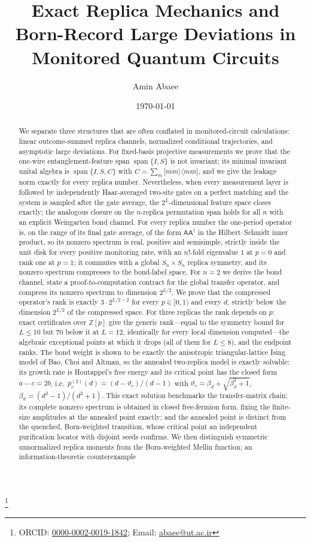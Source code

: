 \documentclass[aps,prx,reprint,superscriptaddress,nobibnotes,longbibliography]{revtex4-2}
\theoremstyle{remark}
\newcommand{\vth}{\vartheta}
\begin{document}
\title{Exact Replica Mechanics and Born-Record Large Deviations in Monitored Quantum Circuits}
\author{Amin Abaee}
\thanks{ORCID: \href{https://orcid.org/0000-0002-0019-1842}{0000-0002-0019-1842}; Email: \href{mailto:abaee@ut.ac.ir}{abaee@ut.ac.ir}}
\date{\today}

\begin{abstract}
We separate three structures that are often conflated in monitored-circuit calculations: linear outcome-summed replica channels, normalized conditional trajectories, and asymptotic large deviations.  For fixed-basis projective measurements we prove that the one-wire entanglement-feature span $\operatorname{span}\{I,S\}$ is not invariant; its minimal invariant unital algebra is $\operatorname{span}\{I,S,C\}$ with $C=\sum_m|mm\rangle\langle mm|$, and we give the leakage norm exactly for every replica number.  Nevertheless, when every measurement layer is followed by independently Haar-averaged two-site gates on a perfect matching and the system is sampled after the gate average, the $2^L$-dimensional feature space closes exactly; the analogous closure on the $n$-replica permutation span holds for all $n$ with an explicit Weingarten bond channel.  For every replica number the one-period operator is, on the range of its final gate average, of the form $\mathsf A\mathsf A^\dagger$ in the Hilbert--Schmidt inner product, so its nonzero spectrum is real, positive and semisimple, strictly inside the unit disk for every positive monitoring rate, with an $n!$-fold eigenvalue $1$ at $p=0$ and rank one at $p=1$; it commutes with a global $S_n\times S_n$ replica symmetry, and its nonzero spectrum compresses to the bond-label space.  For $n=2$ we derive the bond channel, state a proof-to-computation contract for the global transfer operator, and compress its nonzero spectrum to dimension $2^{L/2}$.  We prove that the compressed operator's rank is exactly $3\cdot2^{L/2-2}$ for every $p\in[0,1)$ and every $d$, strictly below the dimension $2^{L/2}$ of the compressed space.  For three replicas the rank depends on $p$: exact certificates over $\mathbb Z[p]$ give the generic rank---equal to the symmetry bound for $L\le10$ but $70$ below it at $L=12$, identically for every local dimension computed---the algebraic exceptional points at which it drops (all of them for $L\le8$), and the endpoint ranks.  The bond weight is shown to be exactly the anisotropic triangular-lattice Ising model of Bao, Choi and Altman, so the annealed two-replica model is exactly solvable: its growth rate is Houtappel's free energy and its critical point has the closed form $a-c=2b$, i.e.\ $p_c^{(2)}(d)=(d-\vth_c)/(d-1)$ with $\vth_c=\beta_d+\sqrt{\beta_d^2+1}$, $\beta_d=(d^2-1)/(d^2+1)$.  This exact solution benchmarks the transfer-matrix chain; its complete nonzero spectrum is obtained in closed free-fermion form, fixing the finite-size amplitudes at the annealed point exactly; and the annealed point is distinct from the quenched, Born-weighted transition, whose critical point an independent purification locator with disjoint seeds confirms.  We then distinguish symmetric unnormalized replica moments from the Born-weighted Mellin function; an information-theoretic counterexample 
\end{abstract}
\end{document}
